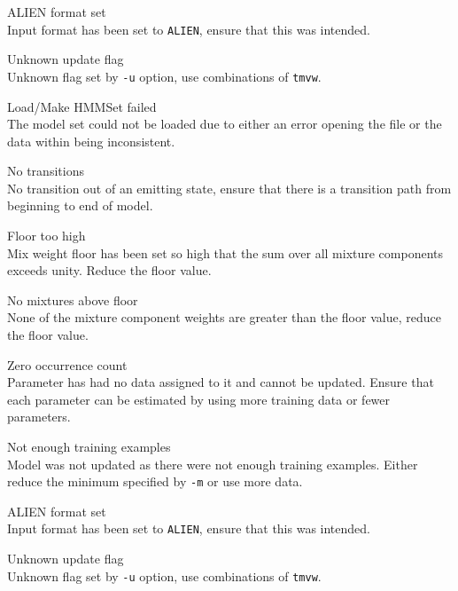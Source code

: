 \begin{itemize}
\begin{itemize}
    ALIEN format set\\
        Input format has been set to \texttt{ALIEN}, ensure that this was 
        intended.

\end{itemize}


\begin{itemize}
    Unknown update flag\\
        Unknown flag set by \texttt{-u} option, use combinations of 
        \texttt{tmvw}.

    Load/Make HMMSet failed\\
        The model set could not be loaded due to either an error opening the
        file or the data within being inconsistent.

    No transitions\\
        No transition out of an emitting state, ensure that
        there is a transition path from beginning to end of model.

    Floor too high\\
        Mix weight floor has been set so high that the sum over all 
        mixture components exceeds unity.  Reduce the floor value.

    No mixtures above floor\\
        None of the mixture component weights are greater than the floor value,
        reduce the floor value.

    Zero occurrence count\\
        Parameter has had no data assigned to it and cannot be
        updated.  Ensure that each parameter can be estimated by
        using more training data or fewer parameters.

    Not enough training examples\\
        Model was not updated as there were not enough training examples.
        Either reduce the minimum specified by \texttt{-m} or
        use more data.

    ALIEN format set\\
        Input format has been set to \texttt{ALIEN}, ensure that this was 
        intended.

\end{itemize}


\begin{itemize}
    Unknown update flag\\
        Unknown flag set by \texttt{-u} option, use combinations of 
        \texttt{tmvw}.


\end{itemize}
\end{itemize}
